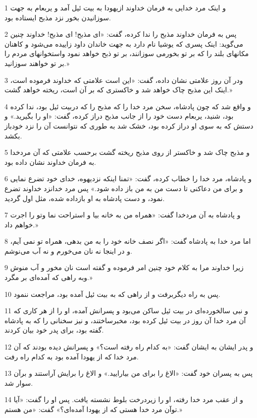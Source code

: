 \par 1 و اینک مرد خدایی به فرمان خداوند ازیهودا به بیت ئیل آمد و یربعام به جهت سوزانیدن بخور نزد مذبح ایستاده بود.
\par 2 پس به فرمان خداوند مذبح را ندا کرده، گفت: «ای مذبح! ای مذبح! خداوند چنین می‌گوید: اینک پسری که یوشیا نام دارد به جهت خاندان داود زاییده می‌شود و کاهنان مکانهای بلند را که بر تو بخورمی سوزانند، بر تو ذبح خواهد نمود واستخوانهای مردم را بر تو خواهند سوزانید.»
\par 3 ودر آن روز علامتی نشان داده، گفت: «این است علامتی که خداوند فرموده است، اینک این مذبح چاک خواهد شد و خاکستری که بر آن است، ریخته خواهد گشت.»
\par 4 و واقع شد که چون پادشاه، سخن مرد خدا را که مذبح را که دربیت ئیل بود، ندا کرده بود، شنید، یربعام دست خود را از جانب مذبح دراز کرده، گفت: «او را بگیرید.» و دستش که به سوی او دراز کرده بود، خشک شد به طوری که نتوانست آن را نزد خودباز بکشد.
\par 5 و مذبح چاک شد و خاکستر از روی مذبح ریخته گشت بر‌حسب علامتی که آن مردخدا به فرمان خداوند نشان داده بود.
\par 6 و پادشاه، مرد خدا را خطاب کرده، گفت: «تمنا اینکه نزدیهوه، خدای خود تضرع نمایی و برای من دعاکنی تا دست من به من باز داده شود.» پس مرد خدانزد خداوند تضرع نمود، و دست پادشاه به او بازداده شده، مثل اول گردید.
\par 7 و پادشاه به آن مردخدا گفت: «همراه من به خانه بیا و استراحت نما وتو را اجرت خواهم داد.»
\par 8 اما مرد خدا به پادشاه گفت: «اگر نصف خانه خود را به من بدهی، همراه تو نمی آیم، و در اینجا نه نان می‌خورم و نه آب می‌نوشم.
\par 9 زیرا خداوند مرا به کلام خود چنین امر فرموده و گفته است نان مخور و آب منوش وبه راهی که آمده‌ای بر مگرد.»
\par 10 پس به راه دیگربرفت و از راهی که به بیت ئیل آمده بود، مراجعت ننمود.
\par 11 و نبی سالخورده‌ای در بیت ئیل ساکن می‌بود و پسرانش آمده، او را از هر کاری که آن مرد خدا آن روز در بیت ئیل کرده بود، مخبرساختند، و نیز سخنانی را که به پادشاه گفته بود، برای پدر خود بیان کردند.
\par 12 و پدر ایشان به ایشان گفت: «به کدام راه رفته است؟» و پسرانش دیده بودند که آن مرد خدا که از یهودا آمده بود به کدام راه رفت.
\par 13 پس به پسران خود گفت: «الاغ را برای من بیارایید.» و الاغ را برایش آراستند و برآن سوار شد.
\par 14 و از عقب مرد خدا رفته، او را زیردرخت بلوط نشسته یافت. پس او را گفت: «آیا توآن مرد خدا هستی که از یهودا آمده‌ای؟» گفت: «من هستم.»
